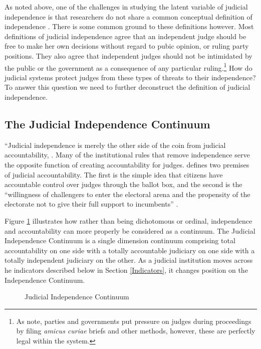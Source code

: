 \documentclass[12pt]{article}
\begin{document}
As noted above, one of the challenges in studying the latent variable of judicial independence is that researchers do not share a common conceptual definition of independence \citep{Linzer2014}.  There is some common ground to these definitions however.  Most definitions of judicial independence agree that an independent judge should be free to make her own decisions without regard to pubic opinion, or ruling party positions.  They also agree that independent judges should not be intimidated by the public or the government as a consequence of any particular ruling.\footnote{As \citet[4]{Rios2014} note, parties and governments put pressure on judges during proceedings by filing \textit{amicus curiae} briefs and other methods, however, these are perfectly legal within the system.}  How do judicial systems protect judges from these types of threats to their independence?  To answer this question we need to further deconstruct the definition of judicial independence. 

\subsection*{The Judicial Independence Continuum}
``Judicial independence is merely the other side of the coin from judicial accountability, \citep{Burbank2008}.  Many of the institutional rules that remove independence serve the opposite function of creating accountability for judges.  \citet{Hall2007} defines two premises of judicial accountability. The first is the simple idea that citizens have accountable control over judges through the ballot box, and the second is the ``willingness of challengers to enter the electoral arena and the propensity of the electorate not to give their full support to incumbents'' \citep[166]{Hall2007}.

Figure \ref{IndCon} illustrates how rather than being dichotomous or ordinal, independence and accountability can more properly be considered as a continuum.  The Judicial Independence Continuum is a single dimension continuum comprising total accountability on one side with a totally accountable judiciary on one side with a totally independent judiciary on the other.  As a judicial institution moves across he indicators described below in Section \ref{Indicators}, it changes position on the Independence Continuum. 

\begin{figure}[tb]\centering\caption{Judicial Independence Continuum}\label{IndCon}
\end{figure}
\end{document}
